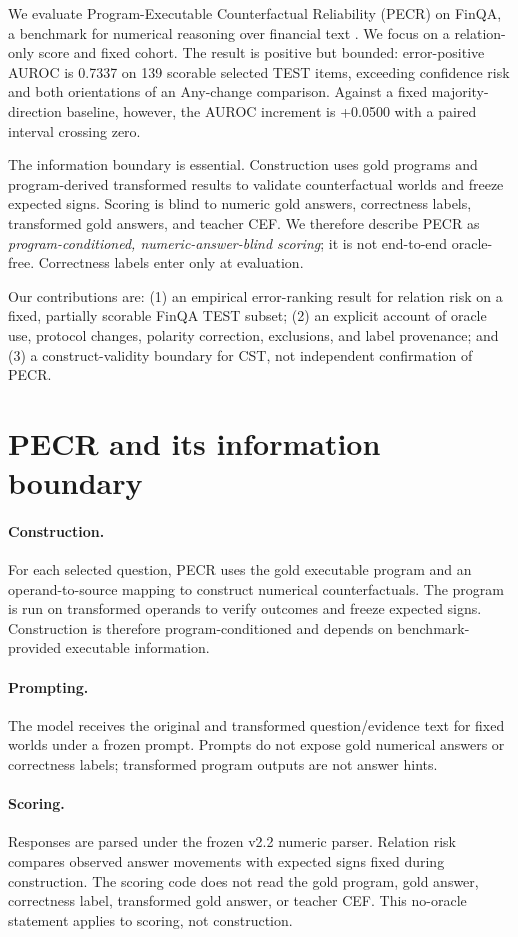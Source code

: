 \documentclass[11pt]{article}
\begin{document}
We evaluate Program-Executable Counterfactual Reliability (PECR) on FinQA, a benchmark for numerical reasoning over financial text \citep{chen-etal-2021-finqa}. We focus on a relation-only score and fixed cohort. The result is positive but bounded: error-positive AUROC is 0.7337 on 139 scorable selected TEST items, exceeding confidence risk and both orientations of an Any-change comparison. Against a fixed majority-direction baseline, however, the AUROC increment is +0.0500 with a paired interval crossing zero.

The information boundary is essential. Construction uses gold programs and program-derived transformed results to validate counterfactual worlds and freeze expected signs. Scoring is blind to numeric gold answers, correctness labels, transformed gold answers, and teacher CEF. We therefore describe PECR as \emph{program-conditioned, numeric-answer-blind scoring}; it is not end-to-end oracle-free. Correctness labels enter only at evaluation.

Our contributions are: (1) an empirical error-ranking result for relation risk on a fixed, partially scorable FinQA TEST subset; (2) an explicit account of oracle use, protocol changes, polarity correction, exclusions, and label provenance; and (3) a construct-validity boundary for CST, not independent confirmation of PECR.

\section{PECR and its information boundary}
\paragraph{Construction.} For each selected question, PECR uses the gold executable program and an operand-to-source mapping to construct numerical counterfactuals. The program is run on transformed operands to verify outcomes and freeze expected signs. Construction is therefore program-conditioned and depends on benchmark-provided executable information.
\paragraph{Prompting.} The model receives the original and transformed question/evidence text for fixed worlds under a frozen prompt. Prompts do not expose gold numerical answers or correctness labels; transformed program outputs are not answer hints.
\paragraph{Scoring.} Responses are parsed under the frozen v2.2 numeric parser. Relation risk compares observed answer movements with expected signs fixed during construction. The scoring code does not read the gold program, gold answer, correctness label, transformed gold answer, or teacher CEF. This no-oracle statement applies to scoring, not construction.
\end{document}
